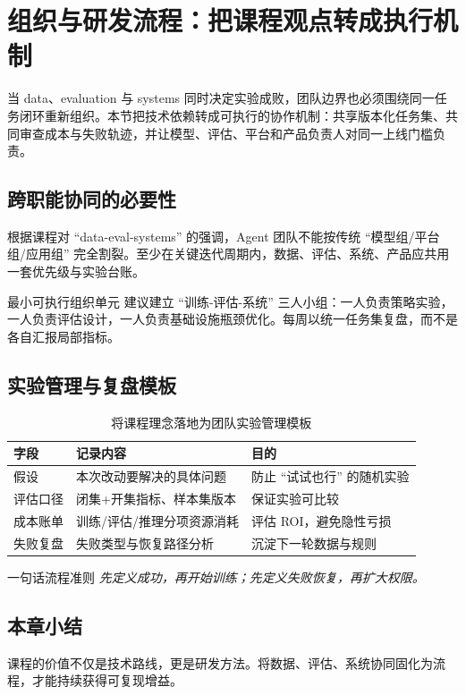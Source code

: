 \section{组织与研发流程：把课程观点转成执行机制}

当 data、evaluation 与 systems 同时决定实验成败，团队边界也必须围绕同一任务闭环重新组织。本节把技术依赖转成可执行的协作机制：共享版本化任务集、共同审查成本与失败轨迹，并让模型、评估、平台和产品负责人对同一上线门槛负责。

\subsection{跨职能协同的必要性}
根据课程对 ``data-eval-systems'' 的强调，Agent 团队不能按传统 ``模型组/平台组/应用组'' 完全割裂。至少在关键迭代周期内，数据、评估、系统、产品应共用一套优先级与实验台账。

\begin{importantbox}{最小可执行组织单元}
建议建立 ``训练-评估-系统'' 三人小组：一人负责策略实验，一人负责评估设计，一人负责基础设施瓶颈优化。每周以统一任务集复盘，而不是各自汇报局部指标。
\end{importantbox}

\subsection{实验管理与复盘模板}
\begin{table}[H]
\centering
\begin{tabular}{p{2.5cm}p{4.1cm}p{5.1cm}}
\toprule
\textbf{字段} & \textbf{记录内容} & \textbf{目的} \\
\midrule
假设 & 本次改动要解决的具体问题 & 防止 ``试试也行'' 的随机实验 \\
评估口径 & 闭集+开集指标、样本集版本 & 保证实验可比较 \\
成本账单 & 训练/评估/推理分项资源消耗 & 评估 ROI，避免隐性亏损 \\
失败复盘 & 失败类型与恢复路径分析 & 沉淀下一轮数据与规则 \\
\bottomrule
\end{tabular}
\caption{将课程理念落地为团队实验管理模板}
\end{table}

\begin{knowledgebox}{一句话流程准则}
\textit{先定义成功，再开始训练；先定义失败恢复，再扩大权限。}
\end{knowledgebox}

\subsection{本章小结}
课程的价值不仅是技术路线，更是研发方法。将数据、评估、系统协同固化为流程，才能持续获得可复现增益。


